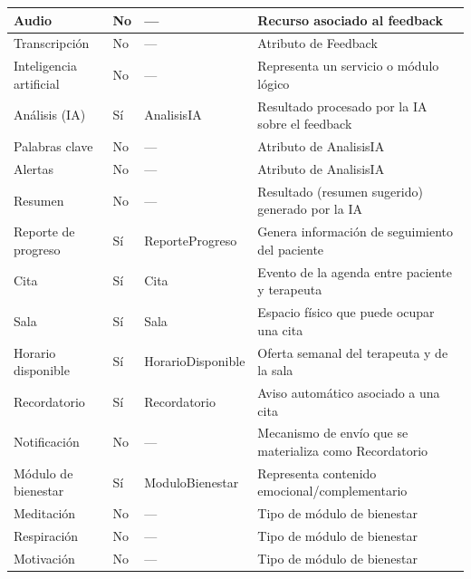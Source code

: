 \documentclass[11pt,letterpaper,oneside]{report}
\begin{document}
\begin{longtable}{|L{3.5cm}|C{2.0cm}|L{3.3cm}|L{5.4cm}|}
Audio & No & --- & Recurso asociado al feedback \\ \hline
Transcripción & No & --- & Atributo de Feedback \\ \hline
Inteligencia artificial & No & --- & Representa un servicio o módulo lógico \\ \hline
Análisis (IA) & Sí & AnalisisIA & Resultado procesado por la IA sobre el feedback \\ \hline
Palabras clave & No & --- & Atributo de AnalisisIA \\ \hline
Alertas & No & --- & Atributo de AnalisisIA \\ \hline
Resumen & No & --- & Resultado (resumen sugerido) generado por la IA \\ \hline
Reporte de progreso & Sí & ReporteProgreso & Genera información de seguimiento del paciente \\ \hline
Cita & Sí & Cita & Evento de la agenda entre paciente y terapeuta \\ \hline
Sala & Sí & Sala & Espacio físico que puede ocupar una cita \\ \hline
Horario disponible & Sí & HorarioDisponible & Oferta semanal del terapeuta y de la sala \\ \hline
Recordatorio & Sí & Recordatorio & Aviso automático asociado a una cita \\ \hline
Notificación & No & --- & Mecanismo de envío que se materializa como Recordatorio \\ \hline
Módulo de bienestar & Sí & ModuloBienestar & Representa contenido emocional/complementario \\ \hline
Meditación & No & --- & Tipo de módulo de bienestar \\ \hline
Respiración & No & --- & Tipo de módulo de bienestar \\ \hline
Motivación & No & --- & Tipo de módulo de bienestar \\ \hline

\end{longtable}
\endgroup
\end{document}
